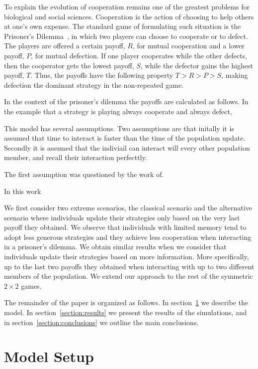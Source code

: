 \documentclass[11pt]{article}
\theoremstyle{plainCl1}
\theoremstyle{plainCl2}
\begin{document}
To explain the evolution of cooperation remains one of the greatest problems for
biological and social sciences. Cooperation is the action of choosing to help
others at one's own expense. The standard game of formulating such situation is
the Prisoner's Dilemma~\cite{trivers1971evolution,
milinski1987tit, glynatsi2021bibliometric, ohtsuki2006simple}, in which two
players can choose to cooperate or to defect. The players are offered a certain
payoff, \(R\), for mutual cooperation and a lower payoff, \(P\), for mutual
defection. If one player cooperates while the other defects, then the cooperator
gets the lowest payoff, \(S\), while the defector gains the highest payoff,
\(T\). Thus, the payoffs have the following property \(T > R > P > S\), making
defection the dominant strategy in the non-repeated game.

In the context of the prisoner's dilemma the payoffs are calculated as follows.
In the example that a strategy is playing always cooperate and always defect,

This model has several assumptions. Two assumptions are that initally it is
assumed that time to interact is faster than the time of the population
update. Secondly it is assumed that the indiviail can interact will every
other population member, and recall their interaction perfecttly.

The first assumption was questioned by the work of.

In this work

We first consider two extreme scenarios, the classical scenario and the
alternative scenario where individuals update their strategies only based on the
very last payoff they obtained. We observe that individuals with limited memory
tend to adopt less generous strategies and they achieve less cooperation when
interacting in a prisoner's dilemma. We obtain similar results when we consider
that individuals update their strategies based on more information. More
specifically, up to the last two payoffs they obtained when interacting with up
to two different members of the population. We extend our approach to the rest
of the symmetric \(2 \times 2\) games.

The remainder of the paper is organized as follows. In
section~\ref{section:model} we describe the model. In
section~\ref{section:results} we present the results of the simulations, and in
section~\ref{section:conclusions} we outline the main conclusions.

\section{Model Setup}\label{section:model}
\end{document}
